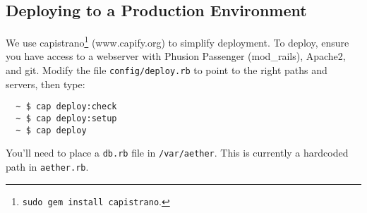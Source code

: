 \subsection{Deploying to a Production Environment}
We use capistrano\footnote{{\tt sudo gem install capistrano}.} (www.capify.org) to simplify deployment. To deploy, ensure you have access to a webserver with Phusion Passenger (mod\_rails), Apache2, and git. Modify the file \verb!config/deploy.rb! to point to the right paths and servers, then type:
\begin{verbatim}
  ~ $ cap deploy:check
  ~ $ cap deploy:setup
  ~ $ cap deploy
\end{verbatim}
You'll need to place a \verb!db.rb! file in \verb!/var/aether!. This is currently a hardcoded path in \verb!aether.rb!.
